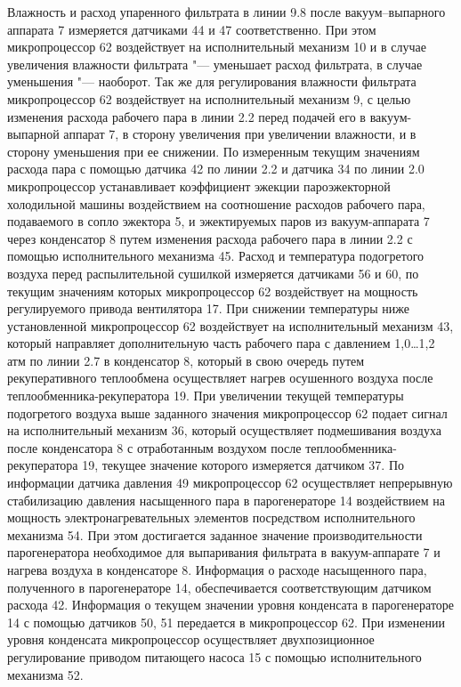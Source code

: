 Влажность и расход упаренного фильтрата в линии 9.8 после вакуум--выпарного аппарата 7 измеряется датчиками 44 и 47 соответственно.
При этом микропроцессор 62 воздействует на исполнительный механизм 10 и в случае увеличения влажности фильтрата  "---  уменьшает расход фильтрата, в случае уменьшения  "---  наоборот. 
Так же для регулирования влажности фильтрата микропроцессор 62 воздействует на исполнительный механизм 9, с целью изменения расхода рабочего пара в линии 2.2 перед подачей его в вакуум-выпарной аппарат 7, в сторону увеличения при увеличении влажности, и в сторону уменьшения при ее снижении. 
По измеренным текущим значениям расхода пара с помощью датчика 42 по линии 2.2 и датчика 34 по линии 2.0 микропроцессор устанавливает коэффициент эжекции пароэжекторной холодильной машины воздействием на соотношение расходов рабочего пара, подаваемого в сопло эжектора 5, и эжектируемых паров из вакуум-аппарата 7 через конденсатор 8 путем изменения расхода рабочего пара в линии 2.2 с помощью исполнительного механизма 45.
Расход и температура подогретого воздуха перед распылительной сушилкой измеряется датчиками 56 и 60, по текущим значениям которых микропроцессор 62 воздействует на мощность регулируемого привода вентилятора 17. 
При снижении температуры ниже установленной микропроцессор 62 воздействует на исполнительный механизм 43, который направляет дополнительную часть рабочего пара с давлением 1,0\dots1,2 атм по линии 2.7 в конденсатор 8, который в свою очередь путем рекуперативного теплообмена осуществляет нагрев осушенного воздуха после теплообменника-рекуператора 19. 
При увеличении текущей температуры подогретого воздуха выше заданного значения микропроцессор 62 подает сигнал на исполнительный механизм 36, который осуществляет подмешивания воздуха после конденсатора 8 с отработанным воздухом после теплообменника-рекуператора 19, текущее значение которого измеряется датчиком 37.
По информации датчика давления 49 микропроцессор 62 осуществляет непрерывную стабилизацию давления насыщенного пара в парогенераторе 14 воздействием на мощность электронагревательных элементов посредством исполнительного механизма 54. 
При этом достигается заданное значение производительности парогенератора необходимое для выпаривания фильтрата в вакуум-аппарате 7 и нагрева воздуха в конденсаторе 8. 
Информация о расходе насыщенного пара, полученного в парогенераторе 14, обеспечивается соответствующим датчиком расхода 42.
Информация о текущем значении уровня конденсата в парогенераторе 14 с помощью датчиков 50, 51 передается в микропроцессор 62. 
При изменении уровня конденсата микропроцессор осуществляет двухпозиционное регулирование приводом питающего насоса 15 с помощью исполнительного механизма 52. 
